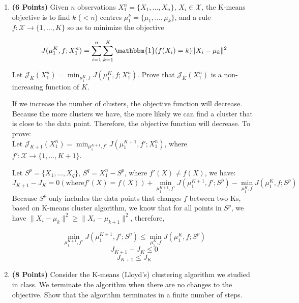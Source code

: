\documentclass[a4paper]{article}
\newcounter{thm}
\newcommand{\Xcal}{\mathcal{X}}
\newcommand{\Jcal}{\mathcal{J}}
\newcommand{\indfone}{\mathbbm{1}}
\theoremstyle{definition}
\newenvironment{soln}{
    \leavevmode\color{blue}\ignorespaces
}{}
\begin{document}
\begin{enumerate}

	\item \textbf{(6 Points)}
	      Given $n$ observations $X_1^n = \{X_1, \dots, X_n\}$, $X_i \in \Xcal$, the K-means objective
	      is to find $k$
	      ($<n$) centres $\mu_1^k = \{\mu_1, \dots, \mu_k\}$, and a rule $f:\Xcal \rightarrow
		      \{1,\dots, K\}$ so as to minimize the objective

	      \begin{equation}
		      J(\mu_1^K, f; X_1^n) = \sum_{i=1}^n \sum_{k=1}^K \indfone(f(X_i) = k) \|X_i - \mu_k\|^2
		      \label{eqn:kmeans}
	      \end{equation}

	      Let $\Jcal_K(X_1^n) = \min_{\mu_1^K, f} J(\mu_1^K, f; X_1^n)$. Prove that
	      $\Jcal_{K}(X_1^n)$ is a non-increasing function of $K$.

	      \begin{soln}
		      If we increase the number of clusters, the objective function will decrease. Because the more clusters we have, the more likely we can find a cluster that is close to the data point. Therefore, the objective function will decrease. To prove:\\

		      Let $\Jcal_{K+1}(X_1^n) = \min_{\mu_1^{K+1}, f'} J(\mu_1^{K+1}, f'; X_1^n)$, where $f': \Xcal \rightarrow \{1,\dots, K+1\}$.

		      Let $S^p = \{X_1, \dots, X_q\}$, $S^q = X_1^n - S^p$, where $f'(X) \neq f(X)$, we have:
		      \[
			      J_{K+1} - J_K = 0 (\text{where} f'(X) = f(X)) + \min_{\mu_1^{K+1}, f'} J(\mu_1^{K+1}, f'; S^p) - \min_{\mu_1^K, f}J(\mu_1^K, f; S^p)
		      \]
		      Because $S^p$ only includes the data points that changes $f$ between two Ks, based on K-means cluster algorithm, we know that for all points in $S^p$, we have $\|X_i - \mu_k\|^2 \geq \|X_i - \mu_{k+1}\|^2$, therefore,

		      \[
			      \min_{\mu_1^{K+1}, f'} J(\mu_1^{K+1}, f'; S^p) \leq \min_{\mu_1^K, f}J(\mu_1^K, f; S^p)
		      \]
		      \[
			      J_{K+1} - J_K \leq 0
		      \]
		      \[
			      J_{K+1} \leq J_K
		      \]
	      \end{soln}

	\item \textbf{(8 Points)}
	      Consider the K-means (Lloyd's) clustering algorithm we studied in class. We
	      terminate the algorithm when there are no changes to the objective.
	      Show that the algorithm terminates in a finite number of steps.

\end{enumerate}
\end{document}

